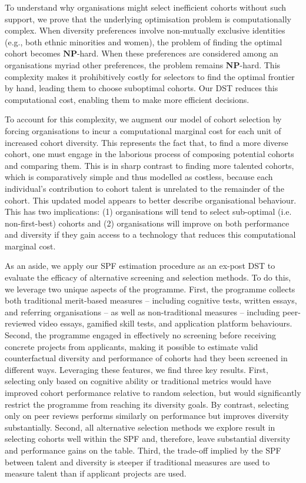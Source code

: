 To understand why organisations might select inefficient cohorts without such support, we prove that the underlying optimisation problem is computationally complex. When diversity preferences involve non-mutually exclusive identities (e.g., both ethnic minorities and women), the problem of finding the optimal cohort becomes $\mathbf{NP}$-hard. When these preferences are considered among an organisations myriad other preferences, the problem remains $\mathbf{NP}$-hard. This complexity makes it prohibitively costly for selectors to find the optimal frontier by hand, leading them to choose suboptimal cohorts. Our DST reduces this computational cost, enabling them to make more efficient decisions.

To account for this complexity, we augment our model of cohort selection by forcing organisations to incur a computational marginal cost for each unit of increased cohort diversity. This represents the fact that, to find a more diverse cohort, one must engage in the laborious process of composing potential cohorts and comparing them. This is in sharp contrast to finding more talented cohorts, which is comparatively simple and thus modelled as costless, because each individual's contribution to cohort talent is unrelated to the remainder of the cohort. This updated model appears to better describe organisational behaviour. This has two implications: (1) organisations will tend to select sub-optimal (i.e. non-first-best) cohorts and (2) organisations will improve on both performance and diversity if they gain access to a technology that reduces this computational marginal cost. 

As an aside, we apply our SPF estimation procedure as an ex-post DST to evaluate the efficacy of alternative screening and selection methods. To do this, we leverage two unique aspects of the programme. First, the programme collects both traditional merit-based measures -- including cognitive tests, written essays, and referring organisations -- as well as non-traditional measures -- including peer-reviewed video essays, gamified skill tests, and application platform behaviours. Second, the programme engaged in effectively no screening before receiving concrete projects from applicants, making it possible to estimate valid counterfactual diversity and performance of cohorts had they been screened in different ways. Leveraging these features, we find three key results. First, selecting only based on cognitive ability or traditional metrics would have improved cohort performance relative to random selection, but would significantly restrict the programme from reaching its diversity goals. By contrast, selecting only on peer reviews performs similarly on performance but improves diversity substantially. Second, all alternative selection methods we explore result in selecting cohorts well within the SPF and, therefore, leave substantial diversity and performance gains on the table. Third, the trade-off implied by the SPF between talent and diversity is steeper if traditional measures are used to measure talent than if applicant projects are used. 

